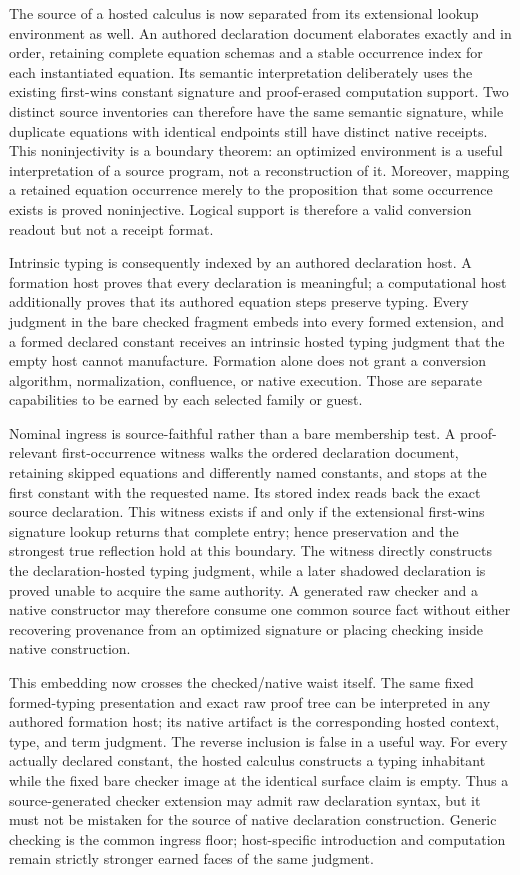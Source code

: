 \documentclass[11pt]{article}
\begin{document}
The source of a hosted calculus is now separated from its extensional lookup
environment as well.  An authored declaration document elaborates exactly and
in order, retaining complete equation schemas and a stable occurrence index for
each instantiated equation.  Its semantic interpretation deliberately uses the
existing first-wins constant signature and proof-erased computation support.
Two distinct source inventories can therefore have the same semantic signature,
while duplicate equations with identical endpoints still have distinct native
receipts.  This noninjectivity is a boundary theorem: an optimized environment
is a useful interpretation of a source program, not a reconstruction of it.
Moreover, mapping a retained equation occurrence merely to the proposition that
some occurrence exists is proved noninjective.  Logical support is therefore a
valid conversion readout but not a receipt format.

Intrinsic typing is consequently indexed by an authored declaration host.  A
formation host proves that every declaration is meaningful; a computational
host additionally proves that its authored equation steps preserve typing.
Every judgment in the bare checked fragment embeds into every formed extension,
and a formed declared constant receives an intrinsic hosted typing judgment
that the empty host cannot manufacture.  Formation alone does not grant a
conversion algorithm, normalization, confluence, or native execution.  Those
are separate capabilities to be earned by each selected family or guest.

Nominal ingress is source-faithful rather than a bare membership test.  A
proof-relevant first-occurrence witness walks the ordered declaration document,
retaining skipped equations and differently named constants, and stops at the
first constant with the requested name.  Its stored index reads back the exact
source declaration.  This witness exists if and only if the extensional
first-wins signature lookup returns that complete entry; hence preservation and
the strongest true reflection hold at this boundary.  The witness directly
constructs the declaration-hosted typing judgment, while a later shadowed
declaration is proved unable to acquire the same authority.  A generated raw
checker and a native constructor may therefore consume one common source fact
without either recovering provenance from an optimized signature or placing
checking inside native construction.

This embedding now crosses the checked/native waist itself.  The same fixed
formed-typing presentation and exact raw proof tree can be interpreted in any
authored formation host; its native artifact is the corresponding hosted
context, type, and term judgment.  The reverse inclusion is false in a useful
way.  For every actually declared constant, the hosted calculus constructs a
typing inhabitant while the fixed bare checker image at the identical surface
claim is empty.  Thus a source-generated checker extension may admit raw
declaration syntax, but it must not be mistaken for the source of native
declaration construction.  Generic checking is the common ingress floor;
host-specific introduction and computation remain strictly stronger earned
faces of the same judgment.
\end{document}
